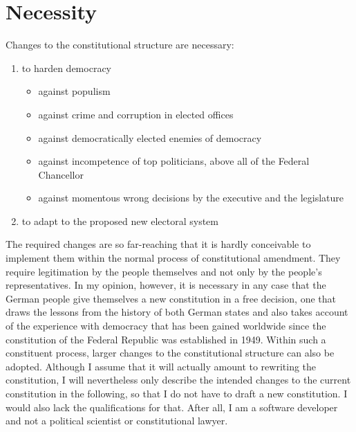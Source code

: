 \section{Necessity}

Changes to the constitutional structure are necessary:
\begin{enumerate}[label=\alph*)]
    \item to harden democracy
    \begin{itemize}
        \item against populism
        \item against crime and corruption in elected offices
        \item against democratically elected enemies of democracy
        \item against incompetence of top politicians, above all of the Federal Chancellor
        \item against momentous wrong decisions by the executive and the legislature
    \end{itemize}
    \item to adapt to the proposed new electoral system
\end{enumerate}

The required changes are so far-reaching that it is hardly conceivable to implement them within the normal process of constitutional amendment.
They require legitimation by the people themselves and not only by the people's representatives.
In my opinion, however, it is necessary in any case that the German people give themselves a new constitution in a free decision,
one that draws the lessons from the history of both German states and also takes account of the experience with democracy that has been gained worldwide since the constitution of the Federal Republic was established in 1949.
Within such a constituent process, larger changes to the constitutional structure can also be adopted.
Although I assume that it will actually amount to rewriting the constitution, I will nevertheless only describe the intended changes to the current constitution in the following, so that I do not have to draft a new constitution.
I would also lack the qualifications for that.
After all, I am a software developer and not a political scientist or constitutional lawyer.








